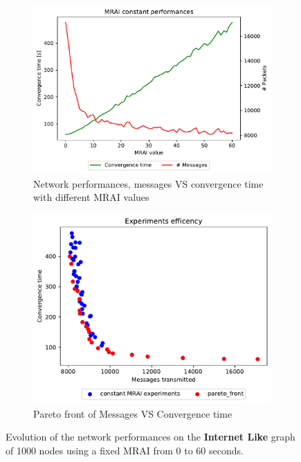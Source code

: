 \begin{figure}[h]
     \centering
     \begin{subfigure}[b]{0.45\textwidth}
         \centering
         \includegraphics[width=\textwidth]{images/internet_like/1000/constantMRAI/internet_like-constant_mrai_evolution.pdf}
		 \caption{Network performances, messages VS convergence time with different
			\ac{MRAI} values}
         \label{fig:internet_like_1000_constant_evolution_evolution}
     \end{subfigure}
     \hfill
     \begin{subfigure}[b]{0.45\textwidth}
         \centering
         \includegraphics[width=\textwidth]{images/internet_like/1000/constantMRAI/internet_like-constant.pdf}
		 \caption{Pareto front of Messages VS Convergence time}
         \label{fig:internet_like_1000_constant_evolution_paretoFront}
     \end{subfigure}
		\caption{Evolution of the network performances on the \textbf{Internet Like} graph 
			of \num{1000} nodes using a fixed \ac{MRAI} from \num{0} to \num{60} seconds.}
        \label{fig:internet_like_1000_constant_evolution}
\end{figure}

